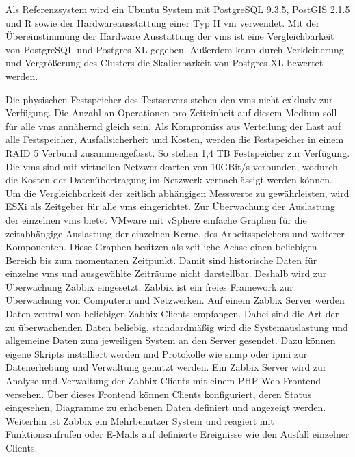 Als Referenzsystem wird ein Ubuntu System mit PostgreSQL 9.3.5, PostGIS 2.1.5 und R sowie der Hardwareausstattung einer Typ II \Gls{vm} verwendet.
Mit der Übereinstimmung der Hardware Ausstattung der \Gls{vm}s ist eine Vergleichbarkeit von PostgreSQL und Postgres-XL gegeben.
Außerdem kann durch Verkleinerung und Vergrößerung des Clusters die Skalierbarkeit von Postgres-XL bewertet werden.

Die physischen Festspeicher des Testservers stehen den \Gls{vm}s nicht exklusiv zur Verfügung.
Die Anzahl an Operationen pro Zeiteinheit auf diesem Medium soll für alle \Gls{vm}s annähernd gleich sein.
Als Kompromiss aus Verteilung der Last auf alle Festspeicher, Ausfallsicherheit und Kosten, werden die Festspeicher in einem RAID 5 Verbund zusammengefasst.
So stehen 1,4 TB Festspeicher zur Verfügung.
Die \Gls{vm}s sind mit virtuellen Netzwerkkarten von 10GBit/s verbunden, wodurch die Kosten der Datenübertragung im Netzwerk vernachlässigt werden können.
Um die Vergleichbarkeit der zeitlich abhängigen Messwerte zu gewährleisten, wird ESXi als Zeitgeber für alle \Gls{vm}s eingerichtet.
Zur Überwachung der Auslastung der einzelnen \Gls{vm}s bietet VMware mit vSphere einfache Graphen für die zeitabhängige Auslastung der einzelnen Kerne, des Arbeitsspeichers und weiterer Komponenten.
Diese Graphen besitzen als zeitliche Achse einen beliebigen Bereich bis zum momentanen Zeitpunkt.
Damit sind historische Daten für einzelne \Gls{vm}s und ausgewählte Zeiträume nicht darstellbar.
Deshalb wird zur Überwachung Zabbix eingesetzt.
Zabbix ist ein freies Framework zur Überwachung von Computern und Netzwerken.
Auf einem Zabbix Server werden Daten zentral von beliebigen Zabbix Clients empfangen.
Dabei sind die Art der zu überwachenden Daten beliebig, standardmäßig wird die Systemauslastung und allgemeine Daten zum jeweiligen System an den Server gesendet.
Dazu können eigene Skripts installiert werden und Protokolle wie \Gls{snmp} oder \Gls{ipmi} zur Datenerhebung und Verwaltung genutzt werden.
Ein Zabbix Server wird zur Analyse und Verwaltung der Zabbix Clients mit einem PHP Web-Frontend versehen.
Über dieses Frontend können Clients konfiguriert, deren Status eingesehen, Diagramme zu erhobenen Daten definiert und angezeigt werden.
Weiterhin ist Zabbix ein Mehrbenutzer System und reagiert mit Funktionsaufrufen oder E-Mails auf definierte Ereignisse wie den Ausfall einzelner Clients.


